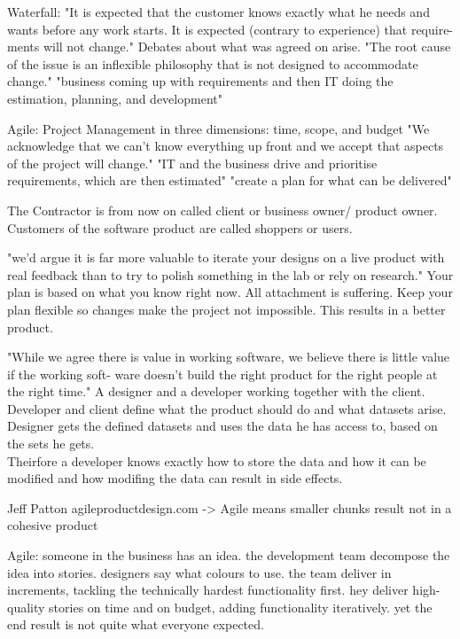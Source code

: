 Waterfall:
"It is expected that the customer knows exactly what he needs and wants before any work starts. It is expected (contrary to experience) that require- ments will not change." Debates about what was agreed on arise. "The root cause of the issue is an inflexible philosophy that is not designed to accommodate change." \citep{ratcliffe2011agile:30}
"business coming up with requirements and then IT doing the estimation, planning, and development"

Agile:
Project Management in three dimensions: time, scope, and budget
"We acknowledge that we can’t know everything up front and we accept that aspects of the project will change." 
"IT and the business drive and prioritise requirements, which are then estimated" "create a plan for what can be delivered"
\citep{ratcliffe2011agile:30-31}

The Contractor is from now on called client or business owner/ product owner.
Customers of the software product are called shoppers or users.

"we'd argue it is far more valuable to iterate your designs on a live product with real feedback than to try to polish something in the lab or rely on research." \citep{ratcliffe2011agile:32}
Your plan is based on what you know right now. All attachment is suffering. Keep your plan flexible so changes make the project not impossible. This results in a better product.

"While we agree there is value in working software, we believe there is little value if the working soft- ware doesn’t build the right product for the right people at the right time." \citep{ratcliffe2011agile:33}
A designer and a developer working together with the client. Developer and client define what the product should do and what datasets arise. Designer gets the defined datasets and uses the data he has access to, based on the sets he gets.\\
Theirfore a developer knows exactly how to store the data and how it can be modified and how modifing the data can result in side effects.

Jeff Patton agileproductdesign.com -> Agile means smaller chunks result not in a cohesive product

Agile:
someone in the business has an idea.
the development team decompose the idea into stories.
designers say what colours to use.
the team deliver in increments, tackling the technically hardest functionality first.
hey deliver high- quality stories on time and on budget, adding functionality iteratively.
yet the end result is not quite what everyone expected.
\citep{ratcliffe2011agile:34-35}


